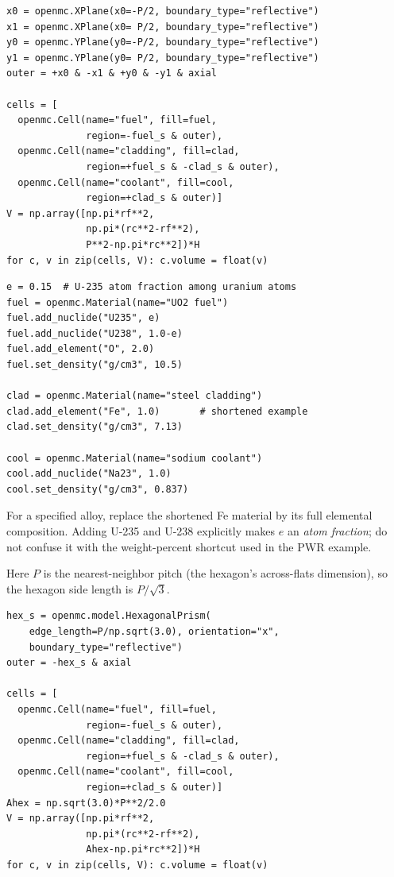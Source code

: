 \documentclass{ne630handout}
\begin{document}
\begin{lstlisting}
x0 = openmc.XPlane(x0=-P/2, boundary_type="reflective")
x1 = openmc.XPlane(x0= P/2, boundary_type="reflective")
y0 = openmc.YPlane(y0=-P/2, boundary_type="reflective")
y1 = openmc.YPlane(y0= P/2, boundary_type="reflective")
outer = +x0 & -x1 & +y0 & -y1 & axial

cells = [
  openmc.Cell(name="fuel", fill=fuel,
              region=-fuel_s & outer),
  openmc.Cell(name="cladding", fill=clad,
              region=+fuel_s & -clad_s & outer),
  openmc.Cell(name="coolant", fill=cool,
              region=+clad_s & outer)]
V = np.array([np.pi*rf**2,
              np.pi*(rc**2-rf**2),
              P**2-np.pi*rc**2])*H
for c, v in zip(cells, V): c.volume = float(v)
\end{lstlisting}
\colnext
{}
\begin{lstlisting}
e = 0.15  # U-235 atom fraction among uranium atoms
fuel = openmc.Material(name="UO2 fuel")
fuel.add_nuclide("U235", e)
fuel.add_nuclide("U238", 1.0-e)
fuel.add_element("O", 2.0)
fuel.set_density("g/cm3", 10.5)

clad = openmc.Material(name="steel cladding")
clad.add_element("Fe", 1.0)       # shortened example
clad.set_density("g/cm3", 7.13)

cool = openmc.Material(name="sodium coolant")
cool.add_nuclide("Na23", 1.0)
cool.set_density("g/cm3", 0.837)
\end{lstlisting}
For a specified alloy, replace the shortened Fe material by its full
elemental composition.  Adding U-235 and U-238 explicitly makes $e$ an
\emph{atom fraction}; do not confuse it with the weight-percent shortcut
used in the PWR example.

Here $P$ is the nearest-neighbor pitch (the hexagon's across-flats
dimension), so the hexagon side length is $P/\sqrt3$.
\begin{lstlisting}
hex_s = openmc.model.HexagonalPrism(
    edge_length=P/np.sqrt(3.0), orientation="x",
    boundary_type="reflective")
outer = -hex_s & axial

cells = [
  openmc.Cell(name="fuel", fill=fuel,
              region=-fuel_s & outer),
  openmc.Cell(name="cladding", fill=clad,
              region=+fuel_s & -clad_s & outer),
  openmc.Cell(name="coolant", fill=cool,
              region=+clad_s & outer)]
Ahex = np.sqrt(3.0)*P**2/2.0
V = np.array([np.pi*rf**2,
              np.pi*(rc**2-rf**2),
              Ahex-np.pi*rc**2])*H
for c, v in zip(cells, V): c.volume = float(v)
\end{lstlisting}
\end{document}
